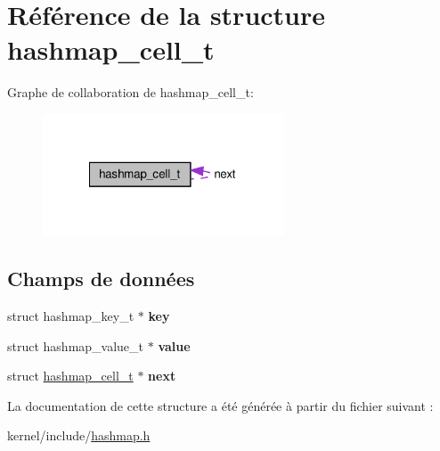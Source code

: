 \hypertarget{structhashmap__cell__t}{\section{Référence de la structure hashmap\-\_\-cell\-\_\-t}
\label{structhashmap__cell__t}
}


Graphe de collaboration de hashmap\-\_\-cell\-\_\-t\-:
\nopagebreak
\begin{figure}[H]
\begin{center}
\leavevmode
\includegraphics[width=203pt]{structhashmap__cell__t__coll__graph}
\end{center}
\end{figure}
\subsection*{Champs de données}
\begin{DoxyCompactItemize}
\item 
\hypertarget{structhashmap__cell__t_a18fa668e172072e9bff5e92e52d9f3af}{struct hashmap\-\_\-key\-\_\-t $\ast$ {\bfseries key}}\label{structhashmap__cell__t_a18fa668e172072e9bff5e92e52d9f3af}

\item 
\hypertarget{structhashmap__cell__t_aa0758cf139adb3747a846e539d01d75d}{struct hashmap\-\_\-value\-\_\-t $\ast$ {\bfseries value}}\label{structhashmap__cell__t_aa0758cf139adb3747a846e539d01d75d}

\item 
\hypertarget{structhashmap__cell__t_afea1a8c217d80c95efa5b4a89ea07bf2}{struct \hyperlink{structhashmap__cell__t}{hashmap\-\_\-cell\-\_\-t} $\ast$ {\bfseries next}}\label{structhashmap__cell__t_afea1a8c217d80c95efa5b4a89ea07bf2}

\end{DoxyCompactItemize}


La documentation de cette structure a été générée à partir du fichier suivant \-:\begin{DoxyCompactItemize}
\item 
kernel/include/\hyperlink{hashmap_8h}{hashmap.\-h}\end{DoxyCompactItemize}
